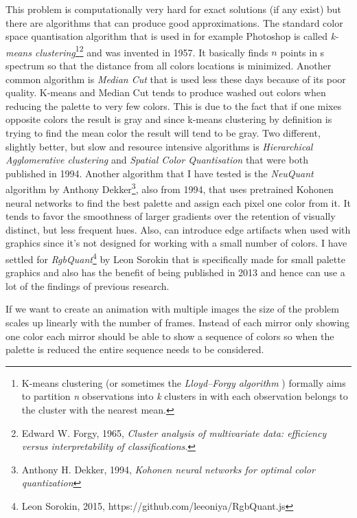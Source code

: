 \documentclass{article}
\begin{document}
This problem is computationally very hard for exact solutions (if any
exist) but there are algorithms that can produce good approximations.
The standard color space quantisation algorithm that is used in for
example Photoshop is called \emph{k-means clustering}\footnote{K-means
  clustering (or sometimes the \emph{Lloyd--Forgy algorithm} ) formally
  aims to partition \emph{n} observations into \emph{k} clusters in with
  each observation belongs to the cluster with the nearest mean.}\footnote{Edward W. Forgy, 1965, \emph{Cluster analysis of multivariate data: efficiency versus interpretability of classifications}.} and
was invented in 1957. It basically finds \(n\) points in s spectrum so
that the distance from all colors locations is minimized. Another
common algorithm is \emph{Median Cut} that is used less these days
because of its poor quality. K-means and Median Cut tends to produce
washed out colors when reducing the palette to very few colors. 
This is due to the fact that if one mixes opposite colors the result is gray
and since k-means clustering by definition is trying to find the mean 
color the result will tend to be gray. Two different, slightly
better, but slow and resource intensive algorithms is \emph{Hierarchical
Agglomerative clustering} and \emph{Spatial Color Quantisation} that
were both published in 1994. Another algorithm that I have tested is the
\emph{NeuQuant} algorithm by Anthony Dekker\footnote{Anthony H. Dekker,
  1994, \emph{Kohonen neural networks for optimal color quantization}},
also from 1994, that uses pretrained Kohonen neural networks to find the
best palette and assign each pixel one color from it. It tends to
favor the smoothness of larger gradients over the retention of visually
distinct, but less frequent hues. Also, can introduce edge artifacts
when used with graphics since it's not designed for working with a small
number of colors. I have settled for \emph{RgbQuant}\footnote{Leon Sorokin, 2015, https://github.com/leeoniya/RgbQuant.js} by Leon Sorokin that is
specifically made for small palette graphics and also has the benefit of
being published in 2013 and hence can use a lot of the findings of
previous research.

If we want to create an animation with multiple images the size of the
problem scales up linearly with the number of frames. Instead of each
mirror only showing one color each mirror should be able to show a
sequence of colors so when the palette is reduced the entire sequence
needs to be considered.
\end{document}
